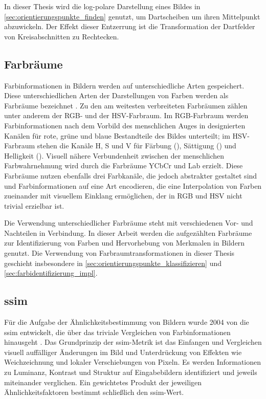 In dieser Thesis wird die log-polare Darstellung eines Bildes in \autoref{sec:orientierungspunkte_finden} genutzt, um Dartscheiben um ihren Mittelpunkt abzuwickeln. Der Effekt dieser Entzerrung ist die Transformation der Dartfelder von Kreisabschnitten zu Rechtecken.


\vfill
\subsection{Farbräume}
\label{sec:farbräume}

Farbinformationen in Bildern werden auf unterschiedliche Arten gespeichert. Diese unterschiedlichen Arten der Darstellungen von Farben werden als Farbräume bezeichnet \cite{color_space,cv_general}. Zu den am weitesten verbreiteten Farbräumen zählen unter anderem der RGB- und der HSV-Farbraum. Im RGB-Farbraum werden Farbinformationen nach dem Vorbild des menschlichen Auges in designierten Kanälen für rote, grüne und blaue Bestandteile des Bildes unterteilt; im HSV-Farbraum stehen die Kanäle H, S und V für Färbung (), Sättigung () und Helligkeit (). Visuell nähere Verbundenheit zwischen der menschlichen Farbwahrnehmung wird durch die Farbräume YCbCr und Lab erzielt. Diese Farbräume nutzen ebenfalls drei Farbkanäle, die jedoch abstrakter gestaltet sind und Farbinformationen auf eine Art encodieren, die eine Interpolation von Farben zueinander mit visuellem Einklang ermöglichen, der in RGB und HSV nicht trivial erzielbar ist.

Die Verwendung unterschiedlicher Farbräume steht mit verschiedenen Vor- und Nachteilen in Verbindung. In dieser Arbeit werden die aufgezählten Farbräume zur Identifizierung von Farben und Hervorhebung von Merkmalen in Bildern genutzt. Die Verwendung von Farbraumtransformationen in dieser Thesis geschieht insbesondere in \autoref{sec:orientierungspunkte_klassifizieren} und \autoref{sec:farbidentifizierung_impl}.


\vfill
\newpage
\subsection{\acl{ssim}}
\label{sec:ssim}

Für die Aufgabe der Ähnlichkeitsbestimmung von Bildern wurde 2004 von \citeauthor{ssim} die \acf{ssim} entwickelt, die über das triviale Vergleichen von Farbinformationen hinausgeht \cite{ssim,cv_general}. Das Grundprinzip der \ac{ssim}-Metrik ist das Einfangen und Vergleichen visuell auffälliger Änderungen im Bild und Unterdrückung von Effekten wie Weichzeichnung und lokaler Verschiebungen von Pixeln. Es werden Informationen zu Luminanz, Kontrast und Struktur auf Eingabebildern identifiziert und jeweils miteinander verglichen. Ein gewichtetes Produkt der jeweiligen Ähnlichkeitsfaktoren bestimmt schließlich den \ac{ssim}-Wert.

